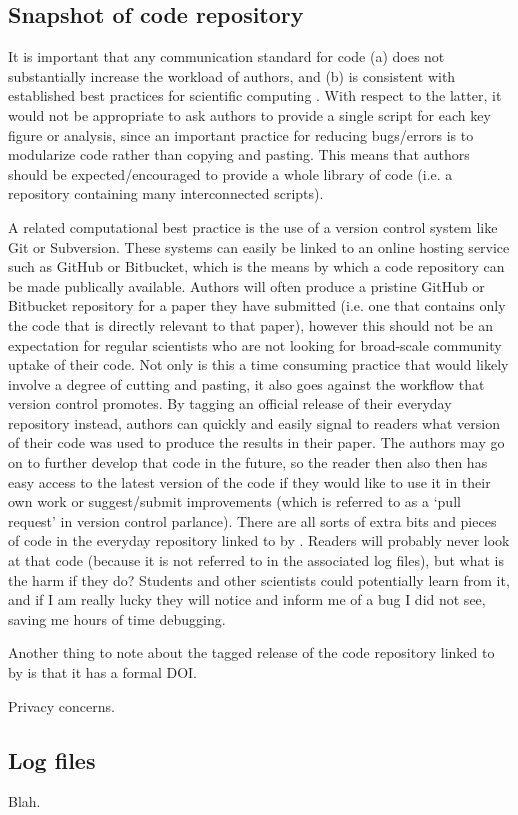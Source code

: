 \subsection{Snapshot of code repository}\label{s:snapshot}

It is important that any communication standard for code (a) does not substantially increase the workload of authors, and (b) is consistent with established best practices for scientific computing \citep{Wilson2014a}. With respect to the latter, it would not be appropriate to ask authors to provide a single script for each key figure or analysis, since an important practice for reducing bugs/errors is to modularize code rather than copying and pasting. This means that authors should be expected/encouraged to provide a whole library of code (i.e. a repository containing many interconnected scripts).

A related computational best practice is the use of a version control system like Git or Subversion. These systems can easily be linked to an online hosting service such as GitHub or Bitbucket, which is the means by which a code repository can be made publically available. Authors will often produce a pristine GitHub or Bitbucket repository for a paper they have submitted (i.e. one that contains only the code that is directly relevant to that paper), however this should not be an expectation for regular scientists who are not looking for broad-scale community uptake of their code. Not only is this a time consuming practice that would likely involve a degree of cutting and pasting, it also goes against the workflow that version control promotes. By tagging an official release of their everyday repository instead, authors can quickly and easily signal to readers what version of their code was used to produce the results in their paper. The authors may go on to further develop that code in the future, so the reader then also then has easy access to the latest version of the code if they would like to use it in their own work or suggest/submit improvements (which is referred to as a `pull request' in version control parlance). There are all sorts of extra bits and pieces of code in the everyday repository linked to by \citet{Irving2015}. Readers will probably never look at that code (because it is not referred to in the associated log files), but what is the harm if they do? Students and other scientists could potentially learn from it, and if I am really lucky they will notice and inform me of a bug I did not see, saving me hours of time debugging.       

Another thing to note about the tagged release of the code repository linked to by \citet{Irving2015} is that it has a formal DOI.

Privacy concerns.


\subsection{Log files}\label{s:log_files}

Blah.